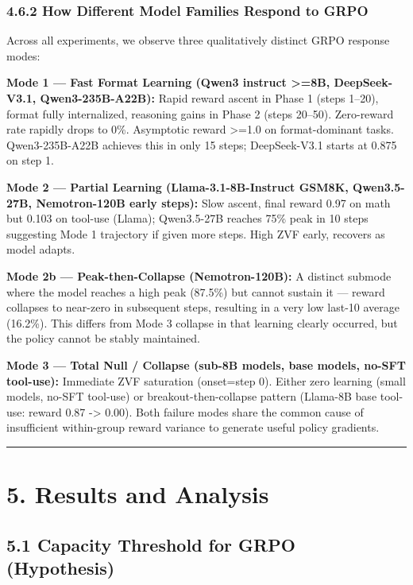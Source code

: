 \documentclass[
  american,
  11pt,
  a4paper,
  oneside]{report}
\begin{document}
\subsection{4.6.2 How Different Model Families Respond to
GRPO}\label{how-different-model-families-respond-to-grpo}

Across all experiments, we observe three qualitatively distinct GRPO
response modes:

\textbf{Mode 1 --- Fast Format Learning (Qwen3 instruct \textgreater=8B,
DeepSeek-V3.1, Qwen3-235B-A22B):} Rapid reward ascent in Phase 1 (steps
1--20), format fully internalized, reasoning gains in Phase 2 (steps
20--50). Zero-reward rate rapidly drops to 0\%. Asymptotic reward
\textgreater=1.0 on format-dominant tasks. Qwen3-235B-A22B achieves this
in only 15 steps; DeepSeek-V3.1 starts at 0.875 on step 1.

\textbf{Mode 2 --- Partial Learning (Llama-3.1-8B-Instruct GSM8K,
Qwen3.5-27B, Nemotron-120B early steps):} Slow ascent, final reward 0.97
on math but 0.103 on tool-use (Llama); Qwen3.5-27B reaches 75\% peak in
10 steps suggesting Mode 1 trajectory if given more steps. High ZVF
early, recovers as model adapts.

\textbf{Mode 2b --- Peak-then-Collapse (Nemotron-120B):} A distinct
submode where the model reaches a high peak (87.5\%) but cannot sustain
it --- reward collapses to near-zero in subsequent steps, resulting in a
very low last-10 average (16.2\%). This differs from Mode 3 collapse in
that learning clearly occurred, but the policy cannot be stably
maintained.

\textbf{Mode 3 --- Total Null / Collapse (sub-8B models, base models,
no-SFT tool-use):} Immediate ZVF saturation (onset=step 0). Either zero
learning (small models, no-SFT tool-use) or breakout-then-collapse
pattern (Llama-8B base tool-use: reward 0.87 -\textgreater{} 0.00). Both
failure modes share the common cause of insufficient within-group reward
variance to generate useful policy gradients.

\begin{center}\rule{0.5\linewidth}{0.5pt}\end{center}

\chapter{5. Results and Analysis}\label{results-and-analysis}

\section{5.1 Capacity Threshold for GRPO
(Hypothesis)}\label{capacity-threshold-for-grpo-hypothesis}
\end{document}
